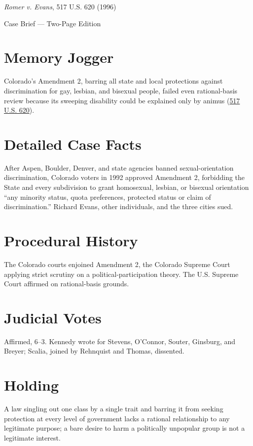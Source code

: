 \documentclass[12pt]{article}
\begin{document}
\begin{center}
{\LARGE \textit{Romer v. Evans}, 517 U.S. 620 (1996)\par}
\vspace{0.5em}
{\large Case Brief --- Two-Page Edition\par}
\end{center}

\section{Memory Jogger}
Colorado's Amendment 2, barring all state and local protections against discrimination for gay, lesbian, and bisexual people, failed even rational-basis review because its sweeping disability could be explained only by animus (\href{https://www.courtlistener.com/opinion/118027/romer-v-evans/}{517 U.S. 620}).

\section{Detailed Case Facts}
After Aspen, Boulder, Denver, and state agencies banned sexual-orientation discrimination, Colorado voters in 1992 approved Amendment 2, forbidding the State and every subdivision to grant homosexual, lesbian, or bisexual orientation ``any minority status, quota preferences, protected status or claim of discrimination.'' Richard Evans, other individuals, and the three cities sued.

\section{Procedural History}
The Colorado courts enjoined Amendment 2, the Colorado Supreme Court applying strict scrutiny on a political-participation theory. The U.S. Supreme Court affirmed on rational-basis grounds.

\section{Judicial Votes}
Affirmed, 6--3. Kennedy wrote for Stevens, O'Connor, Souter, Ginsburg, and Breyer; Scalia, joined by Rehnquist and Thomas, dissented.

\section{Holding}
A law singling out one class by a single trait and barring it from seeking protection at every level of government lacks a rational relationship to any legitimate purpose; a bare desire to harm a politically unpopular group is not a legitimate interest.
\end{document}
